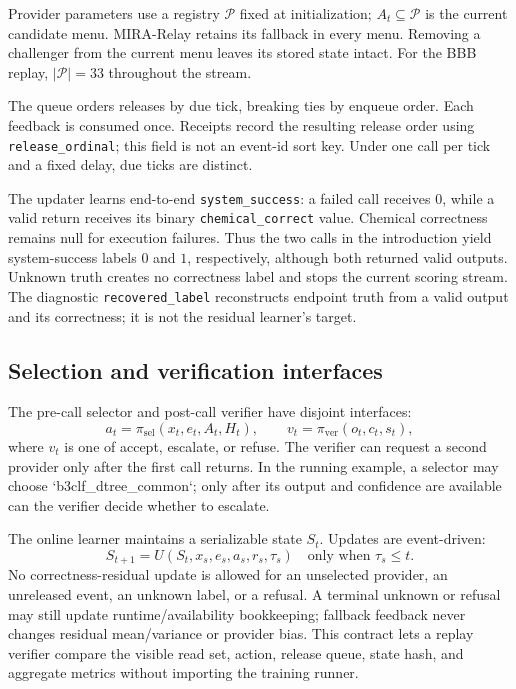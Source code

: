 \documentclass[sigconf,anonymous]{aamas}
\begin{document}
Provider parameters use a registry $\mathcal P$ fixed at initialization; $A_t\subseteq\mathcal P$ is the current candidate menu. MIRA-Relay retains its fallback in every menu. Removing a challenger from the current menu leaves its stored state intact. For the BBB replay, $|\mathcal P|=33$ throughout the stream.

The queue orders releases by due tick, breaking ties by enqueue order. Each feedback is consumed once. Receipts record the resulting release order using \texttt{release\_ordinal}; this field is not an event-id sort key. Under one call per tick and a fixed delay, due ticks are distinct.

The updater learns end-to-end \texttt{system\_success}: a failed call receives $0$, while a valid return receives its binary \texttt{chemical\_correct} value. Chemical correctness remains null for execution failures. Thus the two calls in the introduction yield system-success labels $0$ and $1$, respectively, although both returned valid outputs. Unknown truth creates no correctness label and stops the current scoring stream. The diagnostic \texttt{recovered\_label} reconstructs endpoint truth from a valid output and its correctness; it is not the residual learner's target.

\subsection{Selection and verification interfaces}
The pre-call selector and post-call verifier have disjoint interfaces:
$$
a_t=\pi_{\mathrm{sel}}(x_t,e_t,A_t,H_t),\qquad v_t=\pi_{\mathrm{ver}}(o_t,c_t,s_t),
$$
where $v_t$ is one of accept, escalate, or refuse. The verifier can request a second provider only after the first call returns. In the running example, a selector may choose `b3clf\_dtree\_common`; only after its output and confidence are available can the verifier decide whether to escalate.

The online learner maintains a serializable state $S_t$. Updates are event-driven:
$$
S_{t+1}=U(S_t,x_s,e_s,a_s,r_s,\tau_s)\quad\text{only when }\tau_s\leq t.
$$
No correctness-residual update is allowed for an unselected provider, an unreleased event, an unknown label, or a refusal. A terminal unknown or refusal may still update runtime/availability bookkeeping; fallback feedback never changes residual mean/variance or provider bias. This contract lets a replay verifier compare the visible read set, action, release queue, state hash, and aggregate metrics without importing the training runner.
\end{document}
